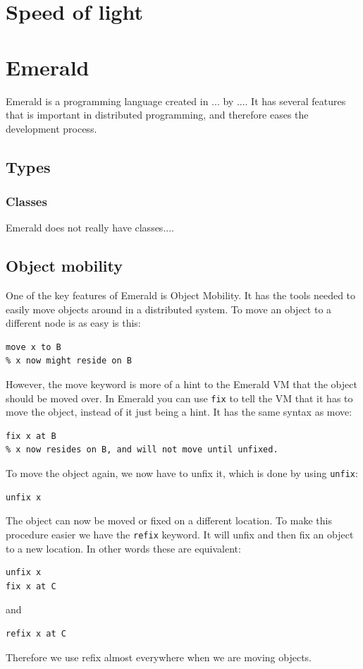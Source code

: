 \section{Speed of light}



\section{Emerald}\label{Emerald}
Emerald is a programming language created in ... by .... It has several features that is important in distributed programming, and therefore eases the development process.

\subsection{Types}

\subsubsection{Classes}
Emerald does not really have classes....

\subsection{Object mobility}
One of the key features of Emerald is Object Mobility. It has the tools needed to easily move objects around in a distributed system. To move an object to a different node is as easy is this:
\begin{lstlisting}[language=emerald]
% x is created and resides on A
move x to B
% x now might reside on B
\end{lstlisting}
However, the move keyword is more of a hint to the Emerald VM that the object should be moved over. In Emerald you can use \verb|fix| to tell the VM that it has to move the object, instead of it just being a hint. It has the same syntax as move:
\begin{lstlisting}[language=emerald]
% x is created and resides on A
fix x at B
% x now resides on B, and will not move until unfixed.
\end{lstlisting}
To move the object again, we now have to unfix it, which is done by using \verb|unfix|:
\begin{lstlisting}[language=emerald]
unfix x
\end{lstlisting}
The object can now be moved or fixed on a different location. To make this procedure easier we have the \verb|refix| keyword. It will unfix and then fix an object to a new location. In other words these are equivalent:
\begin{lstlisting}[language=emerald]
unfix x
fix x at C
\end{lstlisting}
and
\begin{lstlisting}[language=emerald]
refix x at C
\end{lstlisting}
Therefore we use refix almost everywhere when we are moving objects. 

